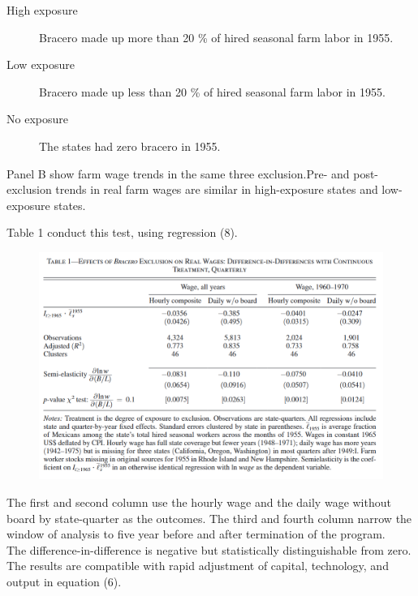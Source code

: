 \documentclass[../root]{subfiles}
\begin{document}
    \begin{description}
        \item [High exposure] Bracero made up more than 20 \% of hired seasonal farm labor in 1955. 
        \item [Low exposure]  Bracero made up less than 20 \% of hired seasonal farm labor in 1955. 
        \item [No exposure] The states had zero bracero in 1955.
    \end{description}
    Panel B show farm wage trends in the same three exclusion.Pre- and post-exclusion trends in real farm wages are similar in high-exposure states and low-exposure states.
    
    Table 1 conduct this test, using regression (8).
    \begin{figure}
        \centering
        \includegraphics[width = \linewidth]{0731sugiyama/Table1.png}
        \label{fig:my_label}
    \end{figure}
    
    The first and second column use the hourly wage and the daily wage without board by state-quarter as the outcomes. The third and fourth column narrow the window of analysis to five year before and after termination of the program.  \\
    The difference-in-difference is negative but statistically distinguishable from zero. The results are compatible with rapid adjustment of capital, technology, and output in equation (6).
    
\end{document}
